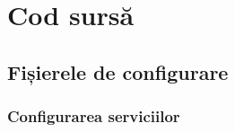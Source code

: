 \chapter{Cod sursă}

\section{Fișierele de configurare
	\label{anx.cfg}}
\subsection{Configurarea serviciilor}
